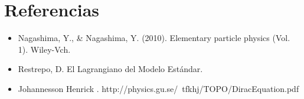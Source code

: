 \documentclass[twocolumn]{article}
\begin{document}
\section{Referencias}
\begin{itemize}
    \item Nagashima, Y., \& Nagashima, Y. (2010). Elementary particle physics (Vol. 1). Wiley-Vch.
    \item Restrepo, D. El Lagrangiano del Modelo Estándar.
    \item Johannesson Henrick . http://physics.gu.se/~tfkhj/TOPO/DiracEquation.pdf
    
\end{itemize}
\end{document}

